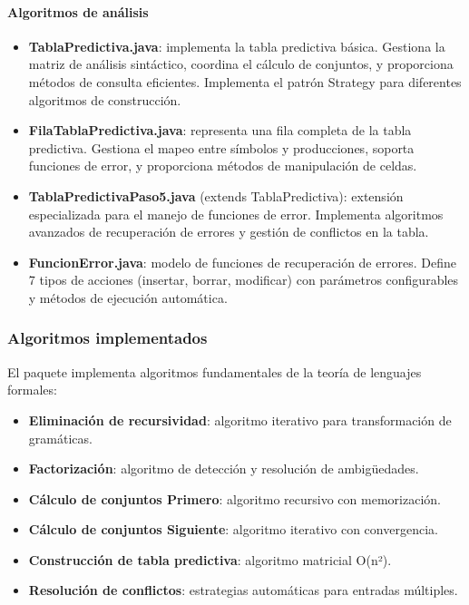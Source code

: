 \paragraph{Algoritmos de análisis}
\begin{itemize}
    \item \textbf{TablaPredictiva.java}: implementa la tabla predictiva básica. Gestiona la matriz de análisis sintáctico, coordina el cálculo de conjuntos, y proporciona métodos de consulta eficientes. Implementa el patrón Strategy para diferentes algoritmos de construcción.

    \item \textbf{FilaTablaPredictiva.java}: representa una fila completa de la tabla predictiva. Gestiona el mapeo entre símbolos y producciones, soporta funciones de error, y proporciona métodos de manipulación de celdas.

    \item \textbf{TablaPredictivaPaso5.java} (extends TablaPredictiva): extensión especializada para el manejo de funciones de error. Implementa algoritmos avanzados de recuperación de errores y gestión de conflictos en la tabla.

    \item \textbf{FuncionError.java}: modelo de funciones de recuperación de errores. Define 7 tipos de acciones (insertar, borrar, modificar) con parámetros configurables y métodos de ejecución automática.
\end{itemize}

\subsubsection{Algoritmos implementados}

El paquete implementa algoritmos fundamentales de la teoría de lenguajes formales:

\begin{itemize}
    \item \textbf{Eliminación de recursividad}: algoritmo iterativo para transformación de gramáticas.
    \item \textbf{Factorización}: algoritmo de detección y resolución de ambigüedades.
    \item \textbf{Cálculo de conjuntos Primero}: algoritmo recursivo con memorización.
    \item \textbf{Cálculo de conjuntos Siguiente}: algoritmo iterativo con convergencia.
    \item \textbf{Construcción de tabla predictiva}: algoritmo matricial O(n²).
    \item \textbf{Resolución de conflictos}: estrategias automáticas para entradas múltiples.
\end{itemize}

